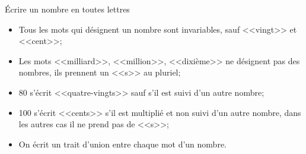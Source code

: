 \begin{mymethname}{\'Ecrire un nombre en toutes lettres}
	\begin{itemize}
		\item Tous les mots qui désignent un nombre sont invariables, sauf <<vingt>> et <<cent>>;
		\item Les mots <<milliard>>, <<million>>, <<dixième>> ne désignent pas des nombres, ils prennent un <<s>> au pluriel;
		\item 80 s'écrit <<quatre-vingts>> sauf s'il est suivi d'un autre nombre;
		\item 100 s'écrit <<cents>> s'il est multiplié et non suivi d'un autre nombre, dans les autres cas il ne prend pas de <<s>>;
		\item On écrit un trait d'union entre chaque mot d'un nombre.
	\end{itemize}
\end{mymethname}


%	
